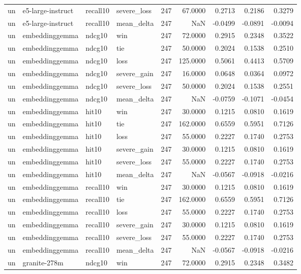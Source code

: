 \begin{tabular}{llllrrrrr}
un & e5-large-instruct & recall10 & severe\_loss & 247 & 67.0000 & 0.2713 & 0.2186 & 0.3279 \\
un & e5-large-instruct & recall10 & mean\_delta & 247 & NaN & -0.0499 & -0.0891 & -0.0094 \\
un & embeddinggemma & ndcg10 & win & 247 & 72.0000 & 0.2915 & 0.2348 & 0.3522 \\
un & embeddinggemma & ndcg10 & tie & 247 & 50.0000 & 0.2024 & 0.1538 & 0.2510 \\
un & embeddinggemma & ndcg10 & loss & 247 & 125.0000 & 0.5061 & 0.4413 & 0.5709 \\
un & embeddinggemma & ndcg10 & severe\_gain & 247 & 16.0000 & 0.0648 & 0.0364 & 0.0972 \\
un & embeddinggemma & ndcg10 & severe\_loss & 247 & 50.0000 & 0.2024 & 0.1538 & 0.2551 \\
un & embeddinggemma & ndcg10 & mean\_delta & 247 & NaN & -0.0759 & -0.1071 & -0.0454 \\
un & embeddinggemma & hit10 & win & 247 & 30.0000 & 0.1215 & 0.0810 & 0.1619 \\
un & embeddinggemma & hit10 & tie & 247 & 162.0000 & 0.6559 & 0.5951 & 0.7126 \\
un & embeddinggemma & hit10 & loss & 247 & 55.0000 & 0.2227 & 0.1740 & 0.2753 \\
un & embeddinggemma & hit10 & severe\_gain & 247 & 30.0000 & 0.1215 & 0.0810 & 0.1619 \\
un & embeddinggemma & hit10 & severe\_loss & 247 & 55.0000 & 0.2227 & 0.1740 & 0.2753 \\
un & embeddinggemma & hit10 & mean\_delta & 247 & NaN & -0.0567 & -0.0918 & -0.0216 \\
un & embeddinggemma & recall10 & win & 247 & 30.0000 & 0.1215 & 0.0810 & 0.1619 \\
un & embeddinggemma & recall10 & tie & 247 & 162.0000 & 0.6559 & 0.5951 & 0.7126 \\
un & embeddinggemma & recall10 & loss & 247 & 55.0000 & 0.2227 & 0.1740 & 0.2753 \\
un & embeddinggemma & recall10 & severe\_gain & 247 & 30.0000 & 0.1215 & 0.0810 & 0.1619 \\
un & embeddinggemma & recall10 & severe\_loss & 247 & 55.0000 & 0.2227 & 0.1740 & 0.2753 \\
un & embeddinggemma & recall10 & mean\_delta & 247 & NaN & -0.0567 & -0.0918 & -0.0216 \\
un & granite-278m & ndcg10 & win & 247 & 72.0000 & 0.2915 & 0.2348 & 0.3482 \\

\end{tabular}
